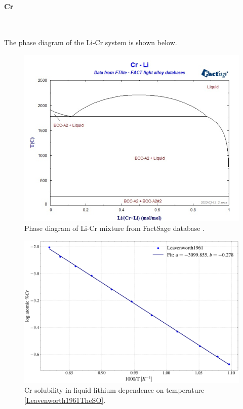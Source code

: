 \paragraph{Cr}~\\
\vspace{1mm} %

The phase diagram of the Li-Cr system is shown below.

\begin{figure}[H]
    \centering
    \includegraphics[width=0.9\linewidth]{Li_Cr_phase_diagram.png}
    \caption{Phase diagram of Li-Cr mixture from FactSage database \cite{Bale2016}.}
    \label{fig:cr_li_diagram}
\end{figure}

\begin{figure}[H]
    \centering
    \includegraphics[width=0.9\linewidth]{solubility_cr.png}
    \caption{Cr solubility in liquid lithium dependence on temperature \ref{Leavenworth1961TheSO}.}
    \label{fig:solubility_cr}
\end{figure}


